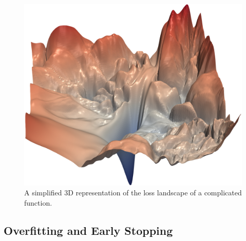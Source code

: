 \documentclass[a4paper,10pt]{scrartcl}
\begin{document}
\begin{figure}[h]
    \includegraphics[scale=0.15]{images/loss-landscape.png}
    \centering
    \caption{A simplified 3D representation of the loss landscape of a complicated function.}
    \label{fig:loss-landscape}
\end{figure}



\subsection{Overfitting and Early Stopping}

\end{document}
